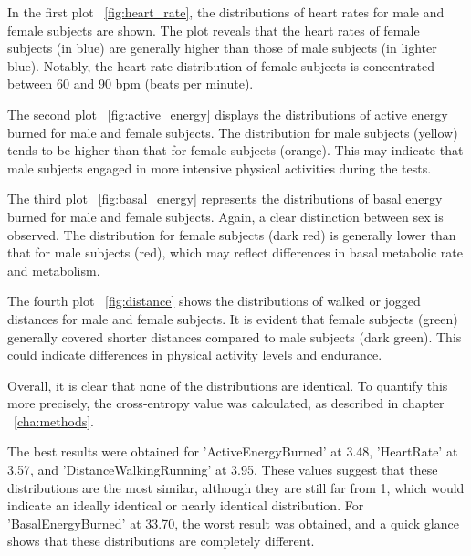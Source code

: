 In the first plot ~\ref{fig:heart_rate}, the distributions of heart rates for male and female subjects are shown. The plot reveals that the heart rates of female subjects (in blue) are generally higher than those of male subjects (in lighter blue). Notably, the heart rate distribution of female subjects is concentrated between 60 and 90 bpm (beats per minute).

The second plot ~\ref{fig:active_energy} displays the distributions of active energy burned for male and female subjects. The distribution for male subjects (yellow) tends to be higher than that for female subjects (orange). This may indicate that male subjects engaged in more intensive physical activities during the tests.

The third plot ~\ref{fig:basal_energy} represents the distributions of basal energy burned for male and female subjects. Again, a clear distinction between sex is observed. The distribution for female subjects (dark red) is generally lower than that for male subjects (red), which may reflect differences in basal metabolic rate and metabolism.

The fourth plot ~\ref{fig:distance} shows the distributions of walked or jogged distances for male and female subjects. It is evident that female subjects (green) generally covered shorter distances compared to male subjects (dark green). This could indicate differences in physical activity levels and endurance.

\newpage

Overall, it is clear that none of the distributions are identical. To quantify this more precisely, the cross-entropy value was calculated, as described in chapter ~\ref{cha:methods}. 

The best results were obtained for 'ActiveEnergyBurned' at 3.48, 'HeartRate' at 3.57, and 'DistanceWalkingRunning' at 3.95. These values suggest that these distributions are the most similar, although they are still far from 1, which would indicate an ideally identical or nearly identical distribution. For 'BasalEnergyBurned' at 33.70, the worst result was obtained, and a quick glance shows that these distributions are completely different.

